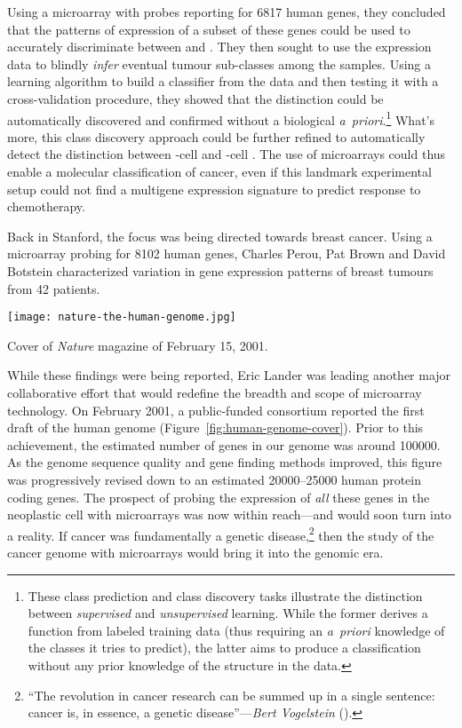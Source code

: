 Using a microarray with probes reporting for 6817 human genes, they concluded
that the patterns of expression of a subset of these genes could be used to
accurately discriminate between  and .  They then
sought to use the expression data to blindly \emph{infer} eventual tumour
\mbox{sub-classes} among the samples.  Using a learning algorithm to build a
classifier from the data and then testing it with a cross-validation procedure,
they showed that the \mbox{} distinction could be
automatically discovered and confirmed without a biological \mbox{\emph{a
    priori}}.\footnote{These class prediction and class discovery tasks
  illustrate the distinction between \emph{supervised} and \emph{unsupervised}
  learning.  While the former derives a function from labeled training data
  (thus requiring an \mbox{\emph{a priori}} knowledge of the classes it tries to
  predict), the latter aims to produce a classification without any prior
  knowledge of the structure in the data.}  What's more, this class discovery
approach could be further refined to automatically detect the distinction
between \mbox{-cell} and \mbox{-cell} .
The use of microarrays could thus enable a molecular classification of cancer,
even if this landmark experimental setup could not find a multigene expression
signature to predict response to chemotherapy.

Back in Stanford, the focus was being directed towards breast cancer.  Using a
microarray probing for \num{8102} human genes, Charles Perou, Pat Brown and
David Botstein characterized variation in gene expression patterns of breast
tumours from 42 patients.\cite{perou_molecular_2000}

\begin{marginfigure}%
  \texttt{[image: nature-the-human-genome.jpg]}
  \caption{Cover of \emph{Nature} magazine of February 15, 2001.}
  \label{fig:human-genome-cover}
\end{marginfigure}

While these findings were being reported, Eric Lander was leading another major
collaborative effort that would redefine the breadth and scope of microarray
technology.  On February 2001, a \mbox{public-funded} consortium reported the
first draft of the human genome (Figure~\ref{fig:human-genome-cover}).  Prior to
this achievement, the estimated number of genes in our genome was around
\num{100000}.\cite{cox_assessing_1994} As the genome sequence quality and gene
finding methods improved, this figure was progressively revised down to an
estimated \num{20000}--\num{25000} human protein coding genes.  The prospect of
probing the expression of \emph{all} these genes in the neoplastic cell with
microarrays was now within reach---and would soon turn into a reality.  If
cancer was fundamentally a genetic disease,\footnote{``The revolution in cancer
  research can be summed up in a single sentence: cancer is, in essence, a
  genetic disease''---\emph{Bert Vogelstein}
  (\citealp{vogelstein_cancer_2004}).} then the study of the cancer genome with
microarrays would bring it into the genomic era.

